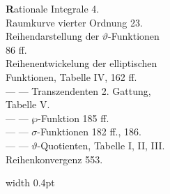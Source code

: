 \begin{minipage}[t]{0.48\textwidth}
\noindent \textbf{R}ationale Integrale 4.\\
Raumkurve vierter Ordnung 23.\\
Reihendarstellung der $\vartheta$-Funktionen\\
86 ff.\\
Reihenentwickelung der elliptischen\\
Funktionen, Tabelle IV, 162 ff.\\
--- --- Transzendenten 2. Gattung,\\
Tabelle V.\\
--- --- $\wp$-Funktion 185 ff.\\
--- --- $\sigma$-Funktionen 182 ff., 186.\\
--- --- $\vartheta$-Quotienten, Tabelle I, II, III.\\
Reihenkonvergenz 553.
\end{minipage}%
\hfill\vrule width 0.4pt\hfill

